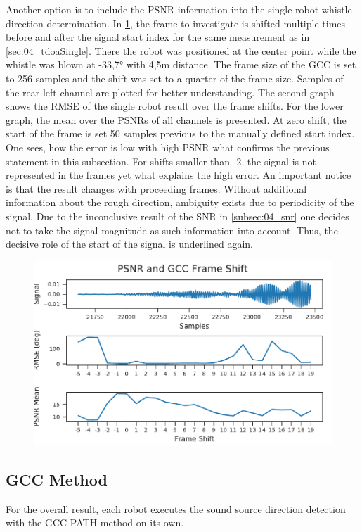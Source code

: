 Another option is to include the PSNR information into the single
robot whistle direction determination.
In \cref{fig:04_psnr2FrameShift}, the frame to investigate is
shifted multiple times before and after the signal start index
for the same measurement as in \cref{sec:04_tdoaSingle}.
There the robot was positioned at the center point
while the whistle was blown at -33,7\si{\degree} with 4,5\si{\meter}
distance.
The frame size of the \ac{GCC} is set to 256 samples and the shift
was set to a quarter of the frame size.
Samples of the rear left channel are plotted for better understanding.
The second graph shows the \ac{RMSE} of the single robot result
over the frame shifts.
For the lower graph, the mean over the \acp{PSNR} of all channels
is presented.
At zero shift, the start of the frame is set 50 samples previous to the
manually defined start index.
One sees, how the error is low with high \ac{PSNR} what confirms
the previous statement in this subsection.
For shifts smaller than -2, the signal is not represented in the
frames yet what explains the high error.
An important notice is that the result changes with proceeding
frames.
Without additional information about the rough direction,
ambiguity exists due to periodicity of the signal.
Due to the inconclusive result of the \ac{SNR} in \cref{subsec:04_snr}
one decides not to take the signal magnitude as such information
into account.
Thus, the decisive role of the start of the signal is underlined again.
\begin{figure}[ht]
	\centering
		\includegraphics[]{figures/evaluation/gcc_frame_shift}
	\caption{}
	\label{fig:04_psnr2FrameShift}
\end{figure}

\subsection{GCC Method}
\label{04_teamGcc}

For the overall result, each robot executes the sound source direction
detection with the \ac{GCC-PATH} method on its own.

